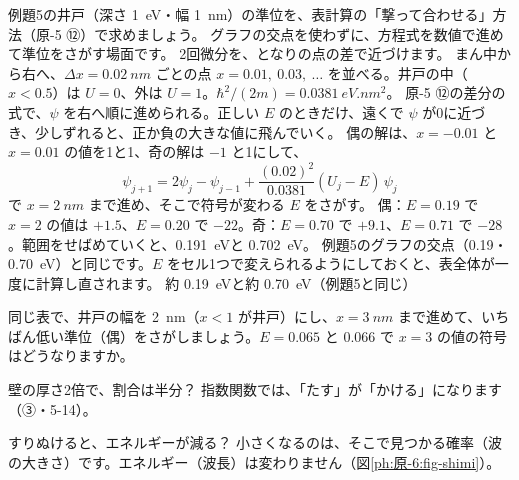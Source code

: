 \label{ph:原-6:ex12}
\begin{phreidai}[表計算で井戸の準位をさがす]
例題5の井戸（深さ \qty{1}{eV}・幅 \qty{1}{nm}）の準位を、表計算の「撃って合わせる」方法（原-5 ⑫）で求めましょう。
\phbamen
グラフの交点を使わずに、方程式を数値で進めて準位をさがす場面です。
\phmushi
2回微分を、となりの点の差で近づけます。
\phzu
まん中から右へ、$\Delta x=\qty{0.02}{nm}$ ごとの点 $x=0.01,\ 0.03,\ \ldots$ を並べる。井戸の中（$x<0.5$）は $U=0$、外は $U=1$。$\hbar^2/(2m)=\qty{0.0381}{eV.nm^2}$。
\phriyu
原-5 ⑫の差分の式で、$\psi$ を右へ順に進められる。正しい $E$ のときだけ、遠くで $\psi$ が0に近づき、少しずれると、正か負の大きな値に飛んでいく。
\phtateru
偶の解は、$x=-0.01$ と $x=0.01$ の値を1と1、奇の解は $-1$ と1にして、
\[\psi_{j+1}=2\psi_j-\psi_{j-1}+\frac{(0.02)^2}{0.0381}(U_j-E)\,\psi_j\]
で $x=\qty{2}{nm}$ まで進め、そこで符号が変わる $E$ をさがす。
\phtoku
偶：$E=0.19$ で $x=2$ の値は $+1.5$、$E=0.20$ で $-22$。奇：$E=0.70$ で $+9.1$、$E=0.71$ で $-28$。範囲をせばめていくと、\qty{0.191}{eV}と \qty{0.702}{eV}。
\phtashikame
例題5のグラフの交点（0.19・\qty{0.70}{eV}）と同じです。$E$ をセル1つで変えられるようにしておくと、表全体が一度に計算し直されます。
\kotae 約 \qty{0.19}{eV}と約 \qty{0.70}{eV}（例題5と同じ）
\end{phreidai}
\begin{jibun}
同じ表で、井戸の幅を \qty{2}{nm}（$x<1$ が井戸）にし、$x=\qty{3}{nm}$ まで進めて、いちばん低い準位（偶）をさがしましょう。$E=0.065$ と 0.066 で $x=3$ の値の符号はどうなりますか。
\end{jibun}

\begin{tsumazuki}{壁の厚さ2倍で、割合は半分？}
指数関数では、「たす」が「かける」になります（③・5-14）。
\end{tsumazuki}

\begin{tsumazuki}{すりぬけると、エネルギーが減る？}
小さくなるのは、そこで見つかる確率（波の大きさ）です。エネルギー（波長）は変わりません（図\ref{ph:原-6:fig-shimi}）。
\end{tsumazuki}

